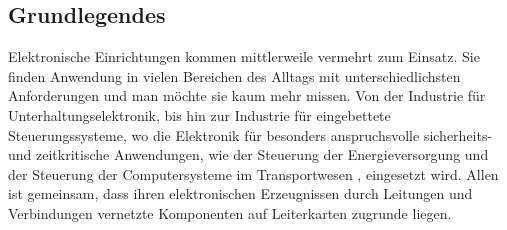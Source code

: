 \subsection{Grundlegendes}
    \label{subsection: Grundlegendes}
    Elektronische Einrichtungen kommen mittlerweile vermehrt zum Einsatz.
    Sie finden Anwendung in vielen Bereichen des Alltags mit unterschiedlichsten Anforderungen und man möchte sie kaum mehr missen.
    Von der Industrie für Unterhaltungselektronik, bis hin zur Industrie für eingebettete Steuerungssysteme, wo die Elektronik für besonders anspruchsvolle sicherheits- und zeitkritische Anwendungen, wie der Steuerung der Energieversorgung und der Steuerung der Computersysteme im Transportwesen \cite{eggersglus_test_2014}, eingesetzt wird.
    Allen ist gemeinsam, dass ihren elektronischen Erzeugnissen durch Leitungen und Verbindungen vernetzte Komponenten auf Leiterkarten zugrunde liegen.





